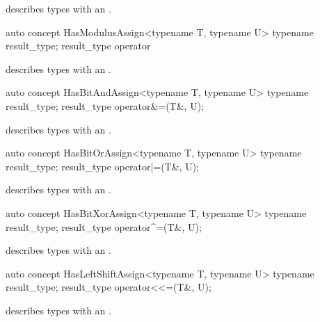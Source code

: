 \documentclass[american,twoside]{book}
\begin{document}
\begin{itemdescr}
\pnum
\mbox{\reallynote} describes types with an \mbox{}.
\end{itemdescr}

\begin{itemdecl}
auto concept HasModulusAssign<typename T, typename U> {
  typename result_type;
  result_type operator%
}
\end{itemdecl}

\begin{itemdescr}
\pnum
\mbox{\reallynote} describes types with an \mbox{}.
\end{itemdescr}

\begin{itemdecl}
auto concept HasBitAndAssign<typename T, typename U> {
  typename result_type;
  result_type operator&=(T&, U);
}
\end{itemdecl}

\begin{itemdescr}
\pnum
\mbox{\reallynote} describes types with an \mbox{}.
\end{itemdescr}

\begin{itemdecl}
auto concept HasBitOrAssign<typename T, typename U> {
  typename result_type;
  result_type operator|=(T&, U);
}
\end{itemdecl}

\begin{itemdescr}
\pnum
\mbox{\reallynote} describes types with an \mbox{}.
\end{itemdescr}

\begin{itemdecl}
auto concept HasBitXorAssign<typename T, typename U> {
  typename result_type;
  result_type operator^=(T&, U);
}
\end{itemdecl}

\begin{itemdescr}
\pnum
\mbox{\reallynote} describes types with an \mbox{}.
\end{itemdescr}

\begin{itemdecl}
auto concept HasLeftShiftAssign<typename T, typename U> {
  typename result_type;
  result_type operator<<=(T&, U);
}
\end{itemdecl}

\begin{itemdescr}
\pnum
\mbox{\reallynote} describes types with an \mbox{}.
\end{itemdescr}
\end{document}
